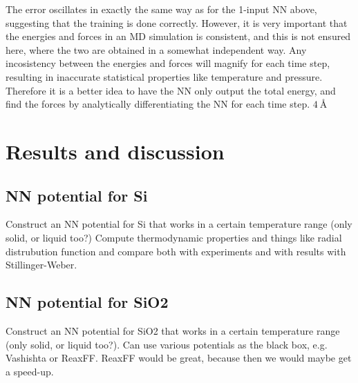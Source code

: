 \documentclass[twoside,english]{uiofysmaster}
\begin{document}
The error oscillates in exactly the same way as for the 1-input NN above, suggesting that the training is done correctly. 
However, it is very important that the energies and forces in an MD simulation is consistent, and this is not 
ensured here, where the two are obtained in a somewhat independent way. Any incosistency between the energies and forces
will magnify for each time step, resulting in inaccurate statistical properties like temperature and pressure. 
Therefore it is a better idea to have the NN only output the total energy, and find the forces by analytically
differentiating the NN for each time step. $\SI{4}{\angstrom}$

\part{Results and discussion}

\chapter{NN potential for Si} \label{sec:SiPotentialResults}
Construct an NN potential for Si that works in a certain temperature range (only solid, or liquid too?)
Compute thermodynamic properties and things like radial distrubution function and compare both 
with experiments and with results with Stillinger-Weber. 

\chapter{NN potential for SiO2}
Construct an NN potential for SiO2 that works in a certain temperature range (only solid, or liquid too?). 
Can use various potentials as the black box, e.g. Vashishta or ReaxFF. 
ReaxFF would be great, because then we would maybe get a speed-up. 
\end{document}
